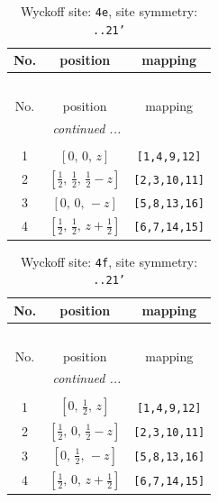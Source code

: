 \documentclass[fleqn,8pt]{jsarticle}
\begin{document}
\begin{longtable}{ccc}
\caption{Wyckoff site: {\tt 4e}, site symmetry: {\tt ..21'}}
 \\
 \hline \hline
No. & position & mapping \\ \hline \endfirsthead

\multicolumn{2}{l}{\tablename\ \thetable{}} \\
 \hline \hline
No. & position & mapping \\ \hline \endhead

 \hline \hline
\multicolumn{2}{r}{\footnotesize\it continued ...} \\ \endfoot

 \hline \hline
\multicolumn{2}{r}{} \\ \endlastfoot

1 & $\left[ 0,\, 0,\, z \right]$ & {\tt [1,4,9,12]} \\ \hline
2 & $\left[ \frac{1}{2},\, \frac{1}{2},\, \frac{1}{2} - z \right]$ & {\tt [2,3,10,11]} \\ \hline
3 & $\left[ 0,\, 0,\, - z \right]$ & {\tt [5,8,13,16]} \\ \hline
4 & $\left[ \frac{1}{2},\, \frac{1}{2},\, z + \frac{1}{2} \right]$ & {\tt [6,7,14,15]} \\
\end{longtable}
\renewcommand{\arraystretch}{1.2}
\begin{longtable}{ccc}
\caption{Wyckoff site: {\tt 4f}, site symmetry: {\tt ..21'}}
 \\
 \hline \hline
No. & position & mapping \\ \hline \endfirsthead

\multicolumn{2}{l}{\tablename\ \thetable{}} \\
 \hline \hline
No. & position & mapping \\ \hline \endhead

 \hline \hline
\multicolumn{2}{r}{\footnotesize\it continued ...} \\ \endfoot

 \hline \hline
\multicolumn{2}{r}{} \\ \endlastfoot

1 & $\left[ 0,\, \frac{1}{2},\, z \right]$ & {\tt [1,4,9,12]} \\ \hline
2 & $\left[ \frac{1}{2},\, 0,\, \frac{1}{2} - z \right]$ & {\tt [2,3,10,11]} \\ \hline
3 & $\left[ 0,\, \frac{1}{2},\, - z \right]$ & {\tt [5,8,13,16]} \\ \hline
4 & $\left[ \frac{1}{2},\, 0,\, z + \frac{1}{2} \right]$ & {\tt [6,7,14,15]} \\
\end{longtable}
\end{document}

